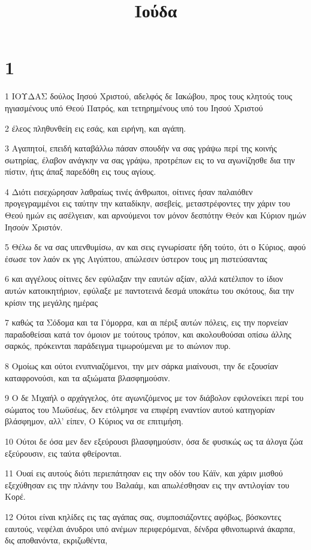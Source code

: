 

\title{Ιούδα}


\chapter{1}

\par 1 ΙΟΥΔΑΣ δούλος Ιησού Χριστού, αδελφός δε Ιακώβου, προς τους κλητούς τους ηγιασμένους υπό Θεού Πατρός, και τετηρημένους υπό του Ιησού Χριστού
\par 2 έλεος πληθυνθείη εις εσάς, και ειρήνη, και αγάπη.
\par 3 Αγαπητοί, επειδή καταβάλλω πάσαν σπουδήν να σας γράψω περί της κοινής σωτηρίας, έλαβον ανάγκην να σας γράψω, προτρέπων εις το να αγωνίζησθε δια την πίστιν, ήτις άπαξ παρεδόθη εις τους αγίους.
\par 4 Διότι εισεχώρησαν λαθραίως τινές άνθρωποι, οίτινες ήσαν παλαιόθεν προγεγραμμένοι εις ταύτην την καταδίκην, ασεβείς, μεταστρέφοντες την χάριν του Θεού ημών εις ασέλγειαν, και αρνούμενοι τον μόνον δεσπότην Θεόν και Κύριον ημών Ιησούν Χριστόν.
\par 5 Θέλω δε να σας υπενθυμίσω, αν και σεις εγνωρίσατε ήδη τούτο, ότι ο Κύριος, αφού έσωσε τον λαόν εκ γης Αιγύπτου, απώλεσεν ύστερον τους μη πιστεύσαντας
\par 6 και αγγέλους οίτινες δεν εφύλαξαν την εαυτών αξίαν, αλλά κατέλιπον το ίδιον αυτών κατοικητήριον, εφύλαξε με παντοτεινά δεσμά υποκάτω του σκότους, δια την κρίσιν της μεγάλης ημέρας
\par 7 καθώς τα Σόδομα και τα Γόμορρα, και αι πέριξ αυτών πόλεις, εις την πορνείαν παραδοθείσαι κατά τον όμοιον με τούτους τρόπον, και ακολουθούσαι οπίσω άλλης σαρκός, πρόκεινται παράδειγμα τιμωρούμεναι με το αιώνιον πυρ.
\par 8 Ομοίως και ούτοι ενυπνιαζόμενοι, την μεν σάρκα μιαίνουσι, την δε εξουσίαν καταφρονούσι, και τα αξιώματα βλασφημούσιν.
\par 9 Ο δε Μιχαήλ ο αρχάγγελος, ότε αγωνιζόμενος με τον διάβολον εφιλονείκει περί του σώματος του Μωϋσέως, δεν ετόλμησε να επιφέρη εναντίον αυτού κατηγορίαν βλάσφημον, αλλ' είπεν, Ο Κύριος να σε επιτιμήση.
\par 10 Ούτοι δε όσα μεν δεν εξεύρουσι βλασφημούσιν, όσα δε φυσικώς ως τα άλογα ζώα εξεύρουσιν, εις ταύτα φθείρονται.
\par 11 Ουαί εις αυτούς διότι περιεπάτησαν εις την οδόν του Κάϊν, και χάριν μισθού εξεχύθησαν εις την πλάνην του Βαλαάμ, και απωλέσθησαν εις την αντιλογίαν του Κορέ.
\par 12 Ούτοι είναι κηλίδες εις τας αγάπας σας, συμποσιάζοντες αφόβως, βόσκοντες εαυτούς, νεφέλαι άνυδροι υπό ανέμων περιφερόμεναι, δένδρα φθινοπωρινά άκαρπα, δις αποθανόντα, εκριζωθέντα,
